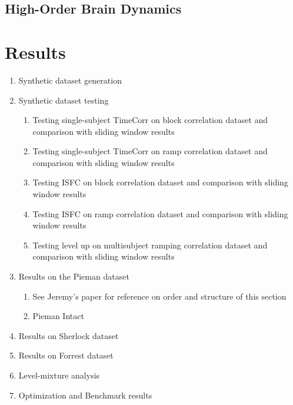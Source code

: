 \documentclass[12pt]{article}
\begin{document}
\subsection{High-Order Brain Dynamics}

\section{Results}
\begin{enumerate}
\item Synthetic dataset generation
\item Synthetic dataset testing
\begin{enumerate}
\item Testing single-subject TimeCorr on block correlation dataset and comparison with sliding window results
\item Testing single-subject TimeCorr on ramp correlation dataset and comparison with sliding window results
\item Testing ISFC on block correlation dataset and comparison with sliding window results
\item Testing ISFC on ramp correlation dataset and comparison with sliding window results
\item Testing level up on multisubject ramping correlation dataset and comparison with sliding window results
\end{enumerate}
\item Results on the Pieman dataset
\begin{enumerate}
\item See Jeremy's paper for reference on order and structure of this section

\item Pieman Intact
\end{enumerate}
\item Results on Sherlock dataset
\item Results on Forrest dataset
\item Level-mixture analysis
\item Optimization and Benchmark results

\end{enumerate}
\end{document}
